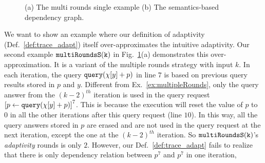 \begin{figure}[h]
\begin{subfigure}[][100pt][b]{.55\textwidth}
\begin{centering}
    \vspace{-0.2cm}
     \caption{}
        \end{centering}
        \end{subfigure}
    \vspace{-0.4cm}
     \caption{(a) The multi rounds single example
     (b) The semantics-based dependency graph.}
    \label{fig:multiRoundsS}
    \vspace{-0.5cm}
    \end{figure}
    We want to show an example where our definition of adaptivity (Def.~\ref{def:trace_adapt}) itself
    over-approximates the intuitive adaptivity.
    Our second example $\mathtt{multiRoundsS(k)}$ in Fig.~\ref{fig:multiRoundsS}(a) demonstrates this over-approximation.
        It is a variant of the multiple rounds strategy with input $k$.
        In each iteration, the query ${\tt query}(\chi[y] + p)$ in line $7$ is based on previous query results stored in $p$ and $y$.
        Different from Ex.~\ref{ex:multipleRounds},
        only the query answer from the $(k - 2)^{th}$ iteration is used in the query request
        $\clabel{\assign{p}{\query(\chi[y]+p)} }^{7}$.
        This is because the execution will reset
        the value of $p$ to $0$ in all the other iterations
        after this query request (line $10$).
        In this way, all the query answers stored in $p$ are erased and are not used
        in the query request at the next iteration, except the one at the $(k - 2)^{th}$ iteration.
        So $\mathtt{multiRoundsS(k)}$'s \emph{adaptivity} rounds is only $2$. 
        However, our Def.~\ref{def:trace_adapt} fails to realize that there is only dependency relation 
        between $p^7$ and $p^7$ in one iteration, 
